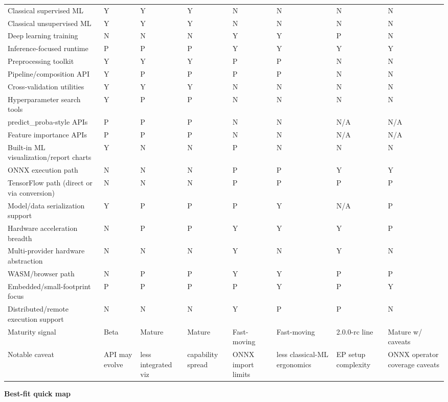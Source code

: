 \documentclass[10pt]{article}
\begin{document}
\begin{longtable}{
  p{2.70in}
  p{0.80in}
  p{0.80in}
  p{0.80in}
  p{0.80in}
  p{0.80in}
  p{0.80in}
  p{0.80in}
}
Classical supervised ML & Y & Y & Y & N & N & N & N \\
Classical unsupervised ML & Y & Y & Y & N & N & N & N \\
Deep learning training & N & N & N & Y & Y & P & N \\
Inference-focused runtime & P & P & P & Y & Y & Y & Y \\
Preprocessing toolkit & Y & Y & Y & P & P & N & N \\
Pipeline/composition API & Y & P & P & P & P & N & N \\
Cross-validation utilities & Y & Y & Y & N & N & N & N \\
Hyperparameter search tools & Y & P & P & N & N & N & N \\
predict\_proba-style APIs & P & P & P & N & N & N/A & N/A \\
Feature importance APIs & P & P & P & N & N & N/A & N/A \\
Built-in ML visualization/report charts & Y & N & N & P & N & N & N \\
ONNX execution path & N & N & N & P & P & Y & Y \\
TensorFlow path (direct or via conversion) & N & N & N & P & P & P & P \\
Model/data serialization support & Y & P & P & P & Y & N/A & P \\
Hardware acceleration breadth & N & P & P & Y & Y & Y & P \\
Multi-provider hardware abstraction & N & N & N & Y & N & Y & N \\
WASM/browser path & N & P & P & Y & Y & P & P \\
Embedded/small-footprint focus & P & P & P & P & Y & P & Y \\
Distributed/remote execution support & N & N & N & Y & P & P & N \\
Maturity signal & Beta & Mature & Mature & Fast-moving & Fast-moving & 2.0.0-rc line & Mature w/ caveats \\
Notable caveat & API may evolve & less integrated viz & capability spread & ONNX import limits & less classical-ML ergonomics & EP setup complexity & ONNX operator coverage caveats \\
\bottomrule
\end{longtable}

\normalsize
\textbf{Best-fit quick map}
\end{document}
